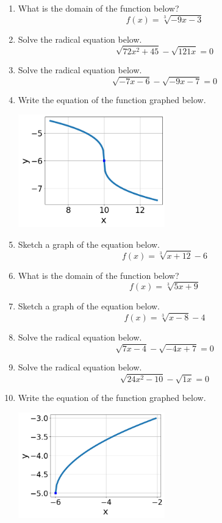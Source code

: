 \documentclass[14pt]{extbook}
\begin{document}
\begin{enumerate}
{\begin{center}
\end{center}
} \newpage
\item{
What is the domain of the function below?\[ f(x) = \sqrt[3]{-9 x - 3} \]} \newpage
\item{
Solve the radical equation below.\[ \sqrt{72 x^2 + 45} - \sqrt{121 x} = 0 \]} \newpage
\item{
Solve the radical equation below.\[ \sqrt{-7 x - 6} - \sqrt{-9 x - 7} = 0 \]} \newpage
\item{
Write the equation of the function graphed below.
\begin{center}
    \includegraphics[width=0.5\textwidth]{../Figures/radicalGraphToEquationB.png}
\end{center}
} \newpage
\item{
Sketch a graph of the equation below.\[ f(x) = \sqrt[3]{x + 12} - 6 \]} \newpage
\item{
What is the domain of the function below?\[ f(x) = \sqrt[3]{5 x + 9} \]} \newpage
\item{
Sketch a graph of the equation below.\[ f(x) = \sqrt[3]{x - 8} - 4 \]} \newpage
\item{
Solve the radical equation below.\[ \sqrt{7 x - 4} - \sqrt{-4 x + 7} = 0 \]} \newpage
\item{
Solve the radical equation below.\[ \sqrt{24 x^2 - 10} - \sqrt{1 x} = 0 \]} \newpage
\item{
Write the equation of the function graphed below.
\begin{center}
    \includegraphics[width=0.5\textwidth]{../Figures/radicalGraphToEquationCopyB.png}

\end{center}}
\end{enumerate}
\end{document}
